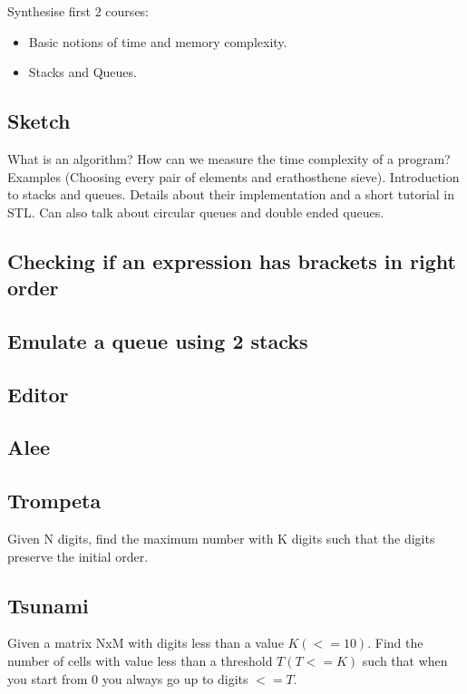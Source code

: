 \documentclass{llncs}
\begin{document}
Synthesise first 2 courses:
\begin{itemize}
	\item Basic notions of time and memory complexity.
	\item Stacks and Queues.
\end{itemize}

\subsection{Sketch}
	What is an algorithm? How can we measure the time complexity of a program? Examples (Choosing every pair of elements and erathosthene sieve).
	Introduction to stacks and queues. Details about their implementation and a short tutorial in STL. Can also talk about circular queues and double ended queues.

\subsection{Checking if an expression has brackets in right order}

\subsection{Emulate a queue using 2 stacks}

\subsection{Editor \cite{website:infoarena/editor}}

\subsection{Alee \cite{website:infoarena/alee}}

\subsection{Trompeta \cite{website:infoarena/trompeta}}
Given N digits, find the maximum number with K digits such that the digits preserve the initial order.

\subsection{Tsunami \cite{website:infoarena/tsunami}}
Given a matrix NxM with digits less than a value $K (<= 10)$. Find the number of cells with value less than a threshold $T (T <= K)$ such that when you start from 0 you always go up to digits $<= T$.
\end{document}
